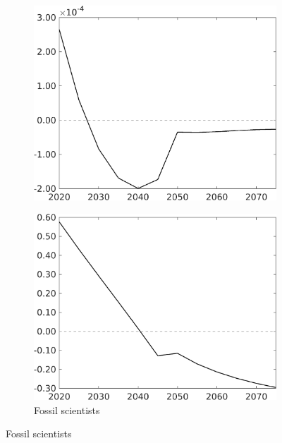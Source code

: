 \begin{figure}[h!!!]
\begin{subfigure}{0.4\textwidth}
	\includegraphics[width=1\textwidth]{../../codding_model/own_basedOnFried/optimalPol_010922_revision/figures/all_13Sept22_Tplus30/SWF_OPT_COMPtaulPer_regime4_spillover0_knspil0_noskill0_sep0_xgrowth0_PV1_etaa0.79.png}
	\end{subfigure}
	\begin{subfigure}{0.4\textwidth}
		\caption{Fossil scientists}
		\includegraphics[width=1\textwidth]{../../codding_model/own_basedOnFried/optimalPol_010922_revision/figures/all_13Sept22_Tplus30/sff_OPT_COMPtaulPer_regime4_spillover0_knspil0_noskill0_sep0_xgrowth0_PV1_etaa0.79.png}
	\end{subfigure}

\end{figure}

